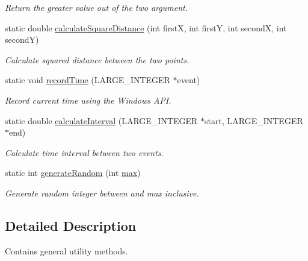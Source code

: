 \begin{DoxyCompactItemize}
\begin{DoxyCompactList}\small\item\em Return the greater value out of the two argument. \end{DoxyCompactList}\item 
static double \hyperlink{classlossycompressor_1_1_utils_a3d136b63cc748174616feefd2340dcab}{calculate\+Square\+Distance} (int firstX, int firstY, int secondX, int secondY)
\begin{DoxyCompactList}\small\item\em Calculate squared distance between the two points. \end{DoxyCompactList}\item 
static void \hyperlink{classlossycompressor_1_1_utils_a43e36268d9b4f77989190d5a7b36485c}{record\+Time} (L\+A\+R\+G\+E\+\_\+\+I\+N\+T\+E\+G\+ER $\ast$event)
\begin{DoxyCompactList}\small\item\em Record current time using the Windows A\+PI. \end{DoxyCompactList}\item 
static double \hyperlink{classlossycompressor_1_1_utils_a1b60e219b809c694aa9ca980288fc618}{calculate\+Interval} (L\+A\+R\+G\+E\+\_\+\+I\+N\+T\+E\+G\+ER $\ast$start, L\+A\+R\+G\+E\+\_\+\+I\+N\+T\+E\+G\+ER $\ast$end)\hypertarget{classlossycompressor_1_1_utils_a1b60e219b809c694aa9ca980288fc618}{}\label{classlossycompressor_1_1_utils_a1b60e219b809c694aa9ca980288fc618}

\begin{DoxyCompactList}\small\item\em Calculate time interval between two events. \end{DoxyCompactList}\item 
static int \hyperlink{classlossycompressor_1_1_utils_a906f479a554b2b819d6116155b3efb1d}{generate\+Random} (int \hyperlink{classlossycompressor_1_1_utils_adf879284f3bd313d718228dba638a81b}{max})\hypertarget{classlossycompressor_1_1_utils_a906f479a554b2b819d6116155b3efb1d}{}\label{classlossycompressor_1_1_utils_a906f479a554b2b819d6116155b3efb1d}

\begin{DoxyCompactList}\small\item\em Generate random integer between and max inclusive. \end{DoxyCompactList}\end{DoxyCompactItemize}


\subsection{Detailed Description}
Contains general utility methods. 

